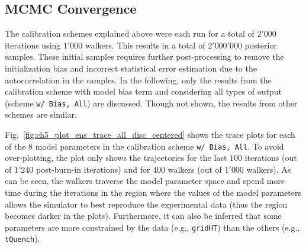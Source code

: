 \subsection{MCMC Convergence}\label{sub:bc_mcmc_convergence}

The calibration schemes explained above were each run for a total of $2'000$ iterations using $1'000$ walkers. 
This results in a total of $2'000'000$ posterior samples.
These initial samples requires further post-process\-ing to remove the initialization bias and incorrect statistical error estimation due to the autocorrelation in the samples.
In the following, only the results from the calibration scheme with model bias term and considering all types of output (scheme \texttt{w/ Bias, All}) are discussed.
Though not shown, the results from other schemes are similar.

Fig.~\ref{fig:ch5_plot_ens_trace_all_disc_centered} shows the trace plots for each of the $8$ model parameters in the calibration scheme \texttt{w/ Bias, All}.
To avoid over-plotting, the plot only shows the trajectories for the last $100$ iterations (out of $1'240$ post-burn-in iterations) and for $400$ walkers (out of $1'000$ walkers). 
As can be seen, the walkers traverse the model parameter space and spend more time during the iterations in the region where the values of the model parameters allows the simulator to best reproduce the experimental data (thus the region becomes darker in the plots).
Furthermore, it can also be inferred that some parameters are more constrained by the data (e.g., \texttt{gridHT}) than the others (e.g., \texttt{tQuench}).

